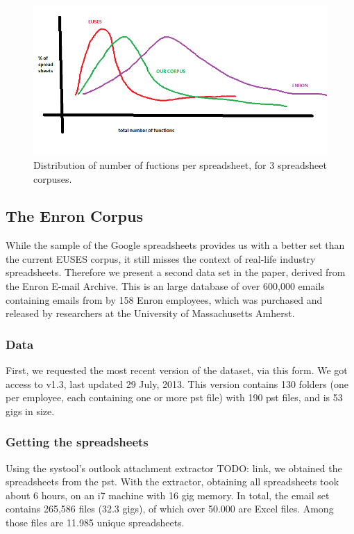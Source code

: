 \documentclass{sig-alternate} %
\begin{document}
\begin{figure}
\centering
\includegraphics[width=\columnwidth]{functions.png}
\caption{Distribution of number of fuctions per spreadsheet, for 3 spreadsheet corpuses.}
\label{fig:effectiveness}
\end{figure}

\subsection{The Enron Corpus}

While the sample of the Google spreadsheets provides us with a better set than the current EUSES corpus, it still misses the context of real-life industry spreadsheets. Therefore we present a second data set in the paper, derived from the Enron E-mail Archive. This is an large database of over 600,000 emails containing emails from by 158 Enron employees, which was purchased and released by researchers at the University of Massachusetts Amherst. 

\subsubsection{Data}
First, we requested the most recent version of the dataset, via this form. We got access to v1.3, last updated 29 July, 2013. This version contains 130 folders (one per employee, each containing one or more pst file) with 190 pst files, and is 53 gigs in size.

\subsubsection{Getting the spreadsheets}
Using the systool's outlook attachment extractor TODO: link, we obtained the spreadsheets from the pst. With the extractor, obtaining all spreadsheets took about 6 hours, on an i7 machine with 16 gig memory. In total, the email set contains 265,586 files (32.3 gigs), of which over 50.000 are Excel files. Among those files are 11.985 unique spreadsheets.
\end{document}
